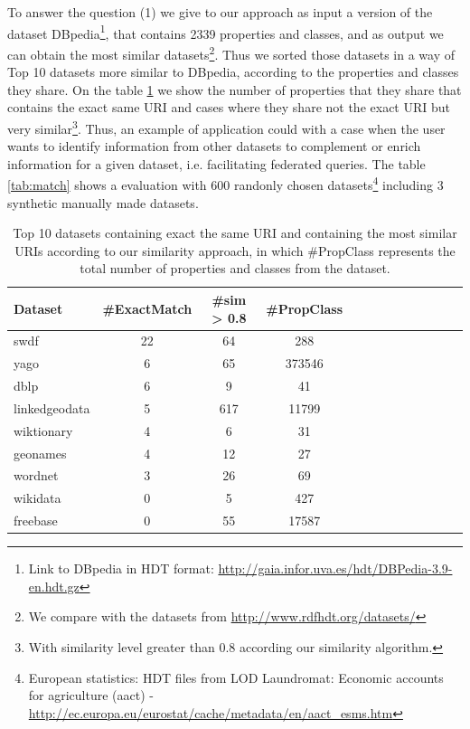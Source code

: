 To answer the question (1) we give to our approach as input a version of the dataset DBpedia\footnote{Link to DBpedia in HDT format: \url{http://gaia.infor.uva.es/hdt/DBPedia-3.9-en.hdt.gz}}, that contains 2339 properties and classes, and as output we can obtain the most similar datasets\footnote{We compare with the datasets from \url{http://www.rdfhdt.org/datasets/}}. Thus we sorted those datasets in a way of Top 10 datasets more similar to DBpedia, according to the properties and classes they share. On the table \ref{tab:top10} we show the number of properties that they share that contains the exact same URI and cases where they share not the exact URI but very similar\footnote{With similarity level greater than 0.8 according our similarity algorithm.}. Thus, an example of application could with a case when the user wants to identify information from other datasets to complement or enrich information for a given dataset, i.e. facilitating federated queries. The table \ref{tab:match} shows a evaluation with 600 randonly chosen datasets\footnote{European statistics: HDT files from LOD Laundromat: Economic accounts for agriculture (aact) - \url{http://ec.europa.eu/eurostat/cache/metadata/en/aact_esms.htm}} including 3 synthetic manually made datasets.

\begin{table}[htb]
\begin{tabular}{lcccccccccccc} \hline
\textbf{Dataset} & \textbf{\#ExactMatch} & \textbf{\#sim > 0.8} & \textbf{\#PropClas}s \\  \hline
swdf & 22 & 64 & 288 \\
yago & 6 & 65 & 373546 \\
dblp & 6 & 9 & 41 \\
linkedgeodata & 5 & 617 & 11799 \\
wiktionary & 4 & 6 & 31 \\
geonames & 4 & 12 & 27 \\
wordnet & 3 & 26 & 69 \\
wikidata & 0 & 5 & 427 \\
freebase & 0 & 55 & 17587 \\ \hline
\end{tabular}
\caption{Top 10 datasets containing exact the same URI and containing the most similar URIs according to our similarity approach, in which \#PropClass represents the total number of properties and classes from the dataset. }
\label{tab:top10}
\end{table}



